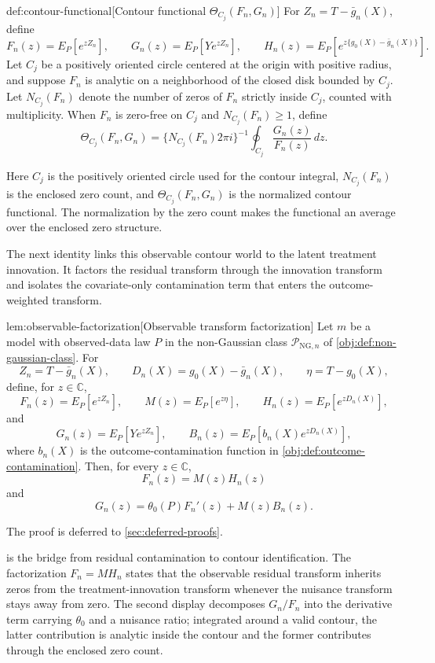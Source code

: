 \documentclass[11pt]{article}
\begin{document}
\begin{definitionv}{def:contour-functional}[Contour functional \(\Theta_{C_j}(F_n,G_n)\)]
For \(Z_n=T-\bar g_n(X)\), define
\[
F_n(z)=E_P[e^{zZ_n}],
\qquad
G_n(z)=E_P[Ye^{zZ_n}],
\qquad
H_n(z)=E_P[e^{z\{g_0(X)-\bar g_n(X)\}}].
\]
Let \(C_j\) be a positively oriented circle centered at the origin with positive radius, and suppose \(F_n\) is analytic on a neighborhood of the closed disk bounded by \(C_j\). Let \(N_{C_j}(F_n)\) denote the number of zeros of \(F_n\) strictly inside \(C_j\), counted with multiplicity. When \(F_n\) is zero-free on \(C_j\) and \(N_{C_j}(F_n)\ge1\), define
\[
\Theta_{C_j}(F_n,G_n)
=
\{N_{C_j}(F_n)2\pi i\}^{-1}
\oint_{C_j}\frac{G_n(z)}{F_n(z)}\,dz .
\]
\end{definitionv}

Here \(C_j\) is the positively oriented circle used for the contour integral, \(N_{C_j}(F_n)\) is the enclosed zero count, and \(\Theta_{C_j}(F_n,G_n)\) is the normalized contour functional. The normalization by the zero count makes the functional an average over the enclosed zero structure.

The next identity links this observable contour world to the latent treatment innovation. It factors the residual transform through the innovation transform and isolates the covariate-only contamination term that enters the outcome-weighted transform.

\begin{lemmav}{lem:observable-factorization}[Observable transform factorization]
Let \(m\) be a model with observed-data law \(P\) in the non-Gaussian class \(\mathcal P_{\mathrm{NG},n}\) of \cref{obj:def:non-gaussian-class}.  For
\[
Z_n=T-\bar g_n(X),\qquad
D_n(X)=g_0(X)-\bar g_n(X),\qquad
\eta=T-g_0(X),
\]
define, for \(z\in\mathbb C\),
\[
F_n(z)=E_P[e^{zZ_n}],\qquad
M(z)=E_P[e^{z\eta}],\qquad
H_n(z)=E_P[e^{zD_n(X)}],
\]
and
\[
G_n(z)=E_P[Ye^{zZ_n}],\qquad
B_n(z)=E_P[b_n(X)e^{zD_n(X)}],
\]
where \(b_n(X)\) is the outcome-contamination function in \cref{obj:def:outcome-contamination}.  Then, for every \(z\in\mathbb C\),
\[
F_n(z)=M(z)H_n(z)
\]
and
\[
G_n(z)=\theta_0(P)F_n'(z)+M(z)B_n(z).
\]
\end{lemmav}

The proof is deferred to \cref{sec:deferred-proofs}.

 is the bridge from residual contamination to contour identification. The factorization \(F_n=MH_n\) states that the observable residual transform inherits zeros from the treatment-innovation transform whenever the nuisance transform stays away from zero. The second display decomposes \(G_n/F_n\) into the derivative term carrying \(\theta_0\) and a nuisance ratio; integrated around a valid contour, the latter contribution is analytic inside the contour and the former contributes through the enclosed zero count.
\end{document}
